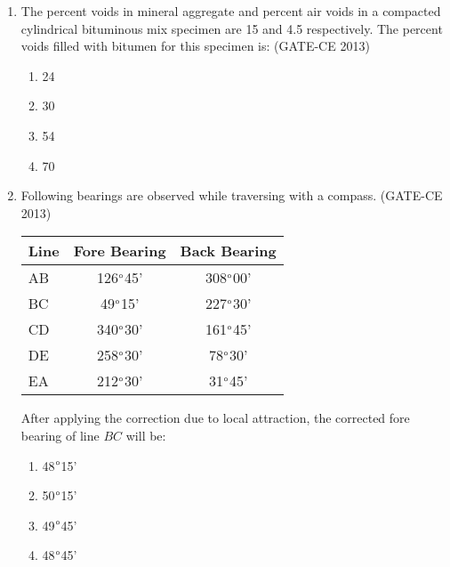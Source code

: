 \documentclass[journal,12pt,onecolumn]{article}
\theoremstyle{remark}
\begin{document}
\begin{enumerate}
    
    Based on the above data, lapse rate can be referred as:
    \begin{multicols}{2}
    \begin{enumerate}
        \item Super-adiabatic 
        \item Neutral 
        \item Sub-adiabatic 
        \item Inversion
    \end{enumerate}
    \end{multicols}
    
    \item The percent voids in mineral aggregate  and percent air voids  in a compacted cylindrical bituminous mix specimen are 15 and 4.5 respectively. The percent voids filled with bitumen  for this specimen is: (GATE-CE 2013)
    \begin{multicols}{4}
    \begin{enumerate}
        \item 24 
        \item 30 
        \item 54 
        \item 70
    \end{enumerate}
    \end{multicols}
    
    \item Following bearings are observed while traversing with a compass. (GATE-CE 2013)
    
    \begin{table}[H]
    \centering
    \begin{tabular}{|l|c|c|}
    \hline
    Line & Fore Bearing & Back Bearing \\
    \hline
    AB & 126$\degree$45' & 308$\degree$00' \\
    BC & 49$\degree$15' & 227$\degree$30' \\
    CD & 340$\degree$30' & 161$\degree$45' \\
    DE & 258$\degree$30' & 78$\degree$30' \\
    EA & 212$\degree$30' & 31$\degree$45' \\
    \hline
    \end{tabular}
    \end{table}
    
    After applying the correction due to local attraction, the corrected fore bearing of line $BC$ will be:
    \begin{multicols}{4}
    \begin{enumerate}
        \item 48$\degree$15' 
        \item 50$\degree$15' 
        \item 49$\degree$45' 
        \item 48$\degree$45'
    \end{enumerate}
    \end{multicols}
    

\end{enumerate}
\end{document}
